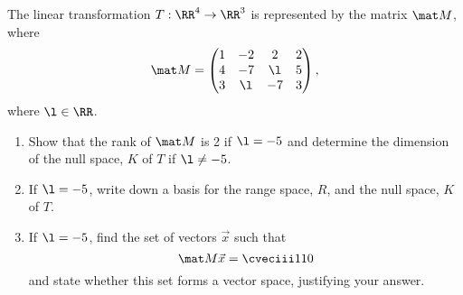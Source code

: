 \begin{problem}
    The linear transformation $T : \RR^4 \to \RR^3$ is represented by the matrix $\mat M$, where \[\mat M = \begin{pmatrix}1 & -2 & 2 & 2 \\ 4 & -7 & \l & 5 \\ 3 & \l & -7 & 3\end{pmatrix},\] where $\l \in \RR$.

    \begin{enumerate}
        \item Show that the rank of $\mat M$ is 2 if $\l = -5$ and determine the dimension of the null space, $K$ of $T$ if $\l \neq -5$.
        \item If $\l = -5$, write down a basis for the range space, $R$, and the null space, $K$ of $T$.
        \item If $\l = -5$, find the set of vectors $\vec x$ such that \[\mat M \vec x = \cveciii110\] and state whether this set forms a vector space, justifying your answer.
    \end{enumerate}
\end{problem}
